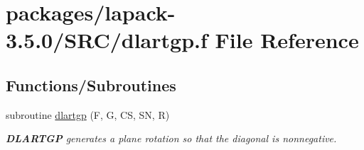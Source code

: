 \hypertarget{dlartgp_8f}{}\section{packages/lapack-\/3.5.0/\+S\+R\+C/dlartgp.f File Reference}
\label{dlartgp_8f}
\subsection*{Functions/\+Subroutines}
\begin{DoxyCompactItemize}
\item 
subroutine \hyperlink{group__auxOTHERauxiliary_gac216c77dadbc793b5f0697555af0775b}{dlartgp} (F, G, C\+S, S\+N, R)
\begin{DoxyCompactList}\small\item\em {\bfseries D\+L\+A\+R\+T\+G\+P} generates a plane rotation so that the diagonal is nonnegative. \end{DoxyCompactList}\end{DoxyCompactItemize}

